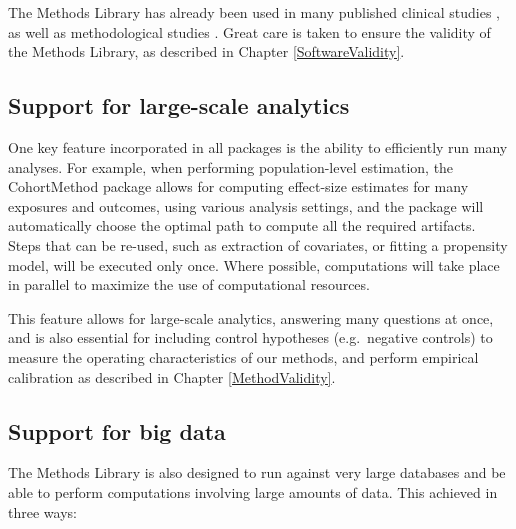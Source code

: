 \documentclass[11pt]{book}
\theoremstyle{definition}
\theoremstyle{definition}
\theoremstyle{definition}
\theoremstyle{remark}
\begin{document}
The Methods Library has already been used in many published clinical studies \citep{boland_2017, duke_2017, ramcharran_2017, weinstein_2017, wang_2017, ryan_2017, ryan_2018, vashisht_2018, yuan_2018, johnston_2019}, as well as methodological studies \citep{schuemie_2014, schuemie_2016, reps2018, tian_2018, schuemie_2018, schuemie_2018b, reps_2019}. Great care is taken to ensure the validity of the Methods Library, as described in Chapter \ref{SoftwareValidity}.

\hypertarget{support-for-large-scale-analytics}{%
\subsection{Support for large-scale analytics}\label{support-for-large-scale-analytics}}

One key feature incorporated in all packages is the ability to efficiently run many analyses. For example, when performing population-level estimation, the CohortMethod package allows for computing effect-size estimates for many exposures and outcomes, using various analysis settings, and the package will automatically choose the optimal path to compute all the required artifacts. Steps that can be re-used, such as extraction of covariates, or fitting a propensity model, will be executed only once. Where possible, computations will take place in parallel to maximize the use of computational resources.

This feature allows for large-scale analytics, answering many questions at once, and is also essential for including control hypotheses (e.g.~negative controls) to measure the operating characteristics of our methods, and perform empirical calibration as described in Chapter \ref{MethodValidity}. 

\hypertarget{BigDataSupport}{%
\subsection{Support for big data}\label{BigDataSupport}}

The Methods Library is also designed to run against very large databases and be able to perform computations involving large amounts of data. This achieved in three ways:
\end{document}
